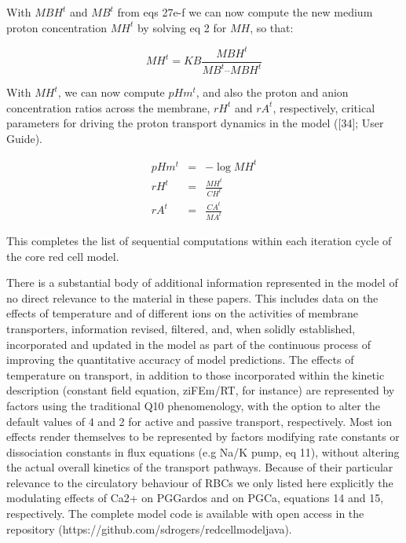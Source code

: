 \documentclass[a4paper]{article}
\newcommand{\med}[1]{M#1}
\newcommand{\cell}[1]{C#1}
\newcommand{\MA}{\med{A}}
\newcommand{\MB}{\med{B}}
\newcommand{\MBH}{\med{BH}}
\newcommand{\MH}{\med{H}}
\newcommand{\CH}{\cell{H}}
\newcommand{\CA}{\cell{A}}
\begin{document}
With $MBH^t$ and $MB^t$ from eqs 27e-f we can now compute the new medium proton concentration $MH^t$ by solving eq 2 for $MH$, so that:

\setcounter{equation}{0}
\renewcommand{\theequation}{28\alph{equation}}

\begin{equation}
\MH^t = KB\frac{\MBH^t}{\MB^t – \MBH^t}
\end{equation}

With $MH^t$, we can now compute $pHm^t$, and also the proton and anion concentration ratios across the membrane, $rH^t$ and $rA^t$, respectively, critical parameters for driving the proton transport dynamics in the model ([34]; User Guide).

\begin{eqnarray}
pHm^t&=& -\log\MH^t\\
rH^t &=&\frac{\MH^t}{\CH^t} \\
rA^t &=& \frac{\CA^t}{\MA^t} 
\end{eqnarray}

This completes the list of sequential computations within each iteration cycle of the core red cell model.    

There is a substantial body of additional information represented in the model of no direct relevance to the material in these papers.  This includes data on the effects of temperature and of different ions on the activities of membrane transporters, information revised, filtered, and, when solidly established, incorporated and updated in the model as part of the continuous process of improving the quantitative accuracy of model predictions.  The effects of temperature on transport, in addition to those incorporated within the kinetic description (constant field equation, ziFEm/RT, for instance) are represented by factors using the traditional Q10 phenomenology, with the option to alter the default values of 4 and 2 for active and passive transport, respectively.  Most ion effects render themselves to be represented by factors modifying rate constants or dissociation constants in flux equations (e.g Na/K pump, eq 11), without altering the actual overall kinetics of the transport pathways. Because of their particular relevance to the circulatory behaviour of RBCs we only listed here explicitly the modulating effects of Ca2+ on PGGardos and on PGCa, equations 14 and 15, respectively. The complete model code is available with open access in the repository (https://github.com/sdrogers/redcellmodeljava).   
\end{document}
